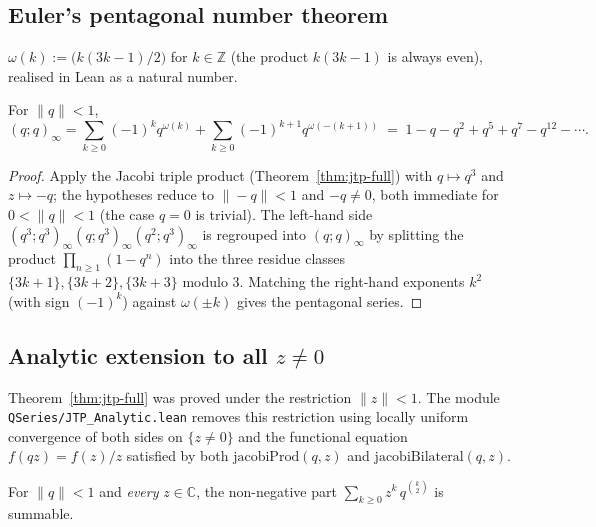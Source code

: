 \subsection{Euler's pentagonal number theorem}

\begin{definition}\label{def:pentagonal}\leanok
$\omega(k) := \bigl(k(3k-1)/2\bigr)$ for $k \in \mathbb{Z}$ (the product
$k(3k-1)$ is always even), realised in Lean as a natural number.
\end{definition}

\begin{theorem}\label{thm:pentagonal-impl}\leanok{}
For $\|q\| < 1$,
\[
  (q;q)_\infty
    = \sum_{k\ge0} (-1)^k q^{\omega(k)}
    + \sum_{k\ge0} (-1)^{k+1} q^{\omega(-(k+1))}
    \;=\; 1 - q - q^2 + q^5 + q^7 - q^{12} - \cdots.
\]
\end{theorem}

\begin{proof}\leanok{}
Apply the Jacobi triple product (Theorem~\ref{thm:jtp-full}) with
$q \mapsto q^3$ and $z \mapsto -q$; the hypotheses reduce to $\|{-}q\| < 1$ and
$-q \neq 0$, both immediate for $0 < \|q\| < 1$ (the case $q = 0$ is trivial).
The left-hand side $(q^3;q^3)_\infty(q;q^3)_\infty(q^2;q^3)_\infty$ is regrouped
into $(q;q)_\infty$ by splitting the product $\prod_{n\ge1}(1 - q^n)$ into the
three residue classes $\{3k+1\},\{3k+2\},\{3k+3\}$ modulo $3$. Matching the
right-hand exponents $k^2$ (with sign $(-1)^k$) against
$\omega(\pm k)$ gives the pentagonal series.
\end{proof}

\subsection{Analytic extension to all \texorpdfstring{$z \neq 0$}{z ≠ 0}}
\label{subsec:analytic-extension}

Theorem~\ref{thm:jtp-full} was proved under the restriction $\|z\| < 1$.
The module \texttt{QSeries/JTP\_Analytic.lean} removes this restriction using
locally uniform convergence of both sides on $\{z \neq 0\}$ and the functional
equation $f(qz) = f(z)/z$ satisfied by both
$\mathrm{jacobiProd}(q,z)$ and $\mathrm{jacobiBilateral}(q,z)$.

\begin{theorem}\label{thm:summable-nonneg-all}\leanok{}
For $\|q\| < 1$ and \emph{every} $z \in \mathbb{C}$, the non-negative part
$\sum_{k \ge 0} z^k\, q^{\binom{k}{2}}$ is summable.
\end{theorem}

